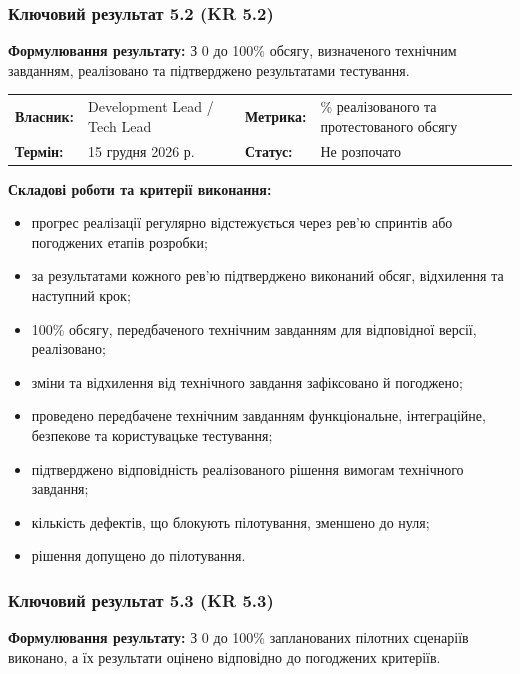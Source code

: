 \documentclass{article}
\begin{document}
\subsubsection{Ключовий результат 5.2 (KR 5.2)}

\textbf{Формулювання результату:} З 0 до 100\% обсягу, визначеного технічним завданням, реалізовано та підтверджено результатами тестування.

\noindent\begin{tabular}{@{}p{2.2cm}p{4.5cm}p{2.2cm}p{4.5cm}@{}}
\toprule
\textbf{Власник:} & Development Lead / Tech Lead & \textbf{Метрика:} & \% реалізованого та протестованого обсягу \\
\textbf{Термін:} & 15 грудня 2026 р. & \textbf{Статус:} & Не розпочато \\
\bottomrule
\end{tabular}

\vspace{10pt}
\textbf{Складові роботи та критерії виконання:}
\begin{itemize}
    \item прогрес реалізації регулярно відстежується через рев’ю спринтів або погоджених етапів розробки;
    \item за результатами кожного рев’ю підтверджено виконаний обсяг, відхилення та наступний крок;
    \item 100\% обсягу, передбаченого технічним завданням для відповідної версії, реалізовано;
    \item зміни та відхилення від технічного завдання зафіксовано й погоджено;
    \item проведено передбачене технічним завданням функціональне, інтеграційне, безпекове та користувацьке тестування;
    \item підтверджено відповідність реалізованого рішення вимогам технічного завдання;
    \item кількість дефектів, що блокують пілотування, зменшено до нуля;
    \item рішення допущено до пілотування.
\end{itemize}

\subsubsection{Ключовий результат 5.3 (KR 5.3)}

\textbf{Формулювання результату:} З 0 до 100\% запланованих пілотних сценаріїв виконано, а їх результати оцінено відповідно до погоджених критеріїв.
\end{document}

